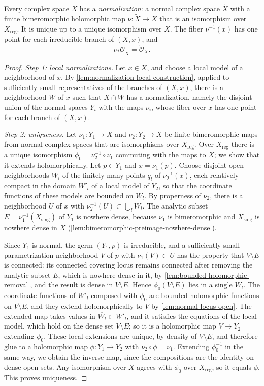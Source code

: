 \begin{theorem}[Normalization]\label{thm:analytic-normalization}
Every complex space $X$ has a \emph{normalization}: a normal complex space $\widetilde X$ with a finite bimeromorphic holomorphic map $\nu\colon\widetilde X\to X$ that is an isomorphism over $X_{\mathrm{reg}}$. It is unique up to a unique isomorphism over $X$. The fiber $\nu^{-1}(x)$ has one point for each irreducible branch of $(X,x)$, and
\[
 \nu_*\mathcal O_{\widetilde X}=\widetilde{\mathcal O}_X.
\]
\end{theorem}
\begin{proof}
\emph{Step 1: local normalizations.} Let $x\in X$, and choose a local model of a neighborhood of $x$. By \cref{lem:normalization-local-construction}, applied to sufficiently small representatives of the branches of $(X,x)$, there is a neighborhood $W$ of $x$ such that $X\cap W$ has a normalization, namely the disjoint union of the normal spaces $Y_i$ with the maps $\nu_i$, whose fiber over $x$ has one point for each branch of $(X,x)$.

\emph{Step 2: uniqueness.} Let $\nu_1\colon Y_1\to X$ and $\nu_2\colon Y_2\to X$ be finite bimeromorphic maps from normal complex spaces that are isomorphisms over $X_{\mathrm{reg}}$. Over $X_{\mathrm{reg}}$ there is a unique isomorphism $\phi_0=\nu_2^{-1}\circ\nu_1$ commuting with the maps to $X$; we show that it extends holomorphically. Let $p\in Y_1$ and $x=\nu_1(p)$. Choose disjoint open neighborhoods $W_l$ of the finitely many points $q_l$ of $\nu_2^{-1}(x)$, each relatively compact in the domain $W'_l$ of a local model of $Y_2$, so that the coordinate functions of these models are bounded on $W_l$. By properness of $\nu_2$, there is a neighborhood $U$ of $x$ with $\nu_2^{-1}(U)\subset\bigcup_lW_l$. The analytic subset $E=\nu_1^{-1}(X_{\mathrm{sing}})$ of $Y_1$ is nowhere dense, because $\nu_1$ is bimeromorphic and $X_{\mathrm{sing}}$ is nowhere dense in $X$ (\cref{lem:bimeromorphic-preimage-nowhere-dense}).

Since $Y_1$ is normal, the germ $(Y_1,p)$ is irreducible, and a sufficiently small parametrization neighborhood $V$ of $p$ with $\nu_1(V)\subset U$ has the property that $V\setminus E$ is connected: its connected covering locus remains connected after removing the analytic subset $E$, which is nowhere dense in it, by \cref{lem:bounded-holomorphic-removal}, and the result is dense in $V\setminus E$. Hence $\phi_0(V\setminus E)$ lies in a single $W_l$. The coordinate functions of $W'_l$ composed with $\phi_0$ are bounded holomorphic functions on $V\setminus E$, and they extend holomorphically to $V$ by \cref{lem:normal-locus-open}. The extended map takes values in $\overline{W_l}\subset W'_l$, and it satisfies the equations of the local model, which hold on the dense set $V\setminus E$; so it is a holomorphic map $V\to Y_2$ extending $\phi_0$. These local extensions are unique, by density of $V\setminus E$, and therefore glue to a holomorphic map $\phi\colon Y_1\to Y_2$ with $\nu_2\circ\phi=\nu_1$. Extending $\phi_0^{-1}$ in the same way, we obtain the inverse map, since the compositions are the identity on dense open sets. Any isomorphism over $X$ agrees with $\phi_0$ over $X_{\mathrm{reg}}$, so it equals $\phi$. This proves uniqueness.


\end{proof}
